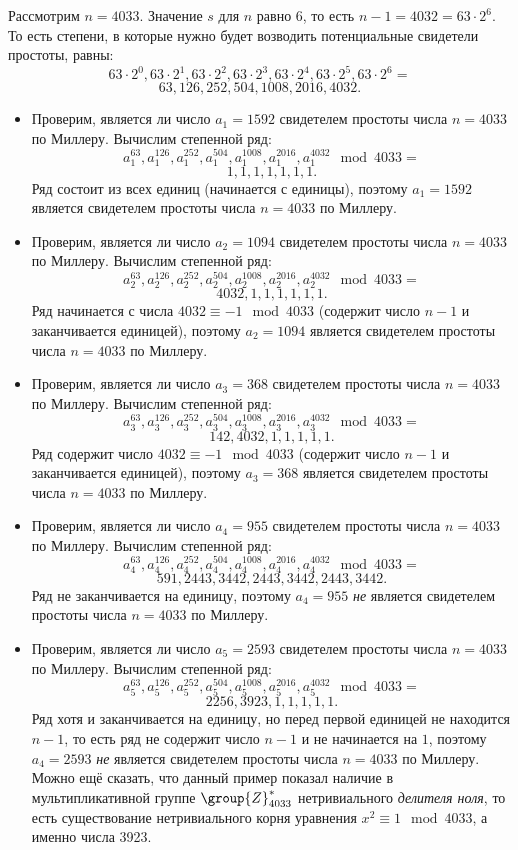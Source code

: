 \example
Рассмотрим $n=4033$. Значение $s$ для $n$ равно $6$, то есть $n - 1 = 4032 = 63 \cdot 2^6$. То есть степени, в которые нужно будет возводить потенциальные свидетели простоты, равны:
\[ 63 \cdot 2^0, 63 \cdot 2^1, 63 \cdot 2^2, 63 \cdot 2^3, 63 \cdot 2^4, 63 \cdot 2^5, 63 \cdot 2^6= \]
\[ 63, 126, 252, 504, 1008, 2016, 4032. \]
\begin{itemize}
	\item Проверим, является ли число $a_1 = 1592$ свидетелем простоты числа $n = 4033$ по Миллеру. Вычислим степенной ряд:
		\[ a_1^{63}, a_1^{126}, a_1^{252}, a_1^{504}, a_1^{1008}, a_1^{2016}, a_1^{4032} \mod 4033 = \]
		\[ 1, 1, 1, 1, 1, 1, 1. \]
		Ряд состоит из всех единиц (начинается с единицы), поэтому $a_1 = 1592$ является свидетелем простоты числа $n = 4033$ по Миллеру.
	\item Проверим, является ли число $a_2 = 1094$ свидетелем простоты числа $n = 4033$ по Миллеру. Вычислим степенной ряд:
		\[ a_2^{63}, a_2^{126}, a_2^{252}, a_2^{504}, a_2^{1008}, a_2^{2016}, a_2^{4032} \mod 4033 =\]
		\[ 4032, 1, 1, 1, 1, 1, 1. \]
		Ряд начинается с числа $4032 \equiv -1 \mod 4033$ (содержит число $n-1$ и заканчивается единицей), поэтому $a_2 = 1094$ является свидетелем простоты числа $n = 4033$ по Миллеру.
	\item Проверим, является ли число $a_3 = 368$ свидетелем простоты числа $n = 4033$ по Миллеру. Вычислим степенной ряд:
		\[ a_3^{63}, a_3^{126}, a_3^{252}, a_3^{504}, a_3^{1008}, a_3^{2016}, a_3^{4032} \mod 4033 =\]
		\[ 142, 4032, 1, 1, 1, 1, 1. \]
		Ряд содержит число $4032 \equiv -1 \mod 4033$ (содержит число $n-1$ и заканчивается единицей), поэтому $a_3 = 368$ является свидетелем простоты числа $n = 4033$ по Миллеру.
	\item Проверим, является ли число $a_4 = 955$ свидетелем простоты числа $n = 4033$ по Миллеру. Вычислим степенной ряд:
		\[ a_4^{63}, a_4^{126}, a_4^{252}, a_4^{504}, a_4^{1008}, a_4^{2016}, a_4^{4032} \mod 4033 = \]
		\[ 591, 2443, 3442, 2443, 3442, 2443, 3442. \]
		Ряд не заканчивается на единицу, поэтому $a_4 = 955$ \emph{не} является свидетелем простоты числа $n = 4033$ по Миллеру.
	\item Проверим, является ли число $a_5 = 2593$ свидетелем простоты числа $n = 4033$ по Миллеру. Вычислим степенной ряд:
		\[ a_5^{63}, a_5^{126}, a_5^{252}, a_5^{504}, a_5^{1008}, a_5^{2016}, a_5^{4032} \mod 4033 =\]
		\[ 2256, 3923, 1, 1, 1, 1, 1. \]
		Ряд хотя и заканчивается на единицу, но перед первой единицей не находится $n-1$, то есть ряд не содержит число $n-1$ и не начинается на $1$, поэтому $a_4 = 2593$ \emph{не} является свидетелем простоты числа $n = 4033$ по Миллеру. Можно ещё сказать, что данный пример показал наличие в мультипликативной группе $\group{Z}_{4033}^{*}$ нетривиального \emph{делителя ноля}, то есть существование нетривиального корня уравнения $ x^2 \equiv 1 \mod 4033$, а именно числа 3923.
\end{itemize}
\exampleend

